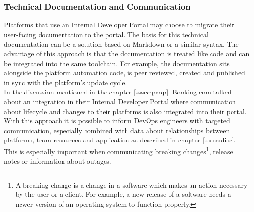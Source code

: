 \documentclass[a4paper,12pt]{article}
\begin{document}
    \subsubsection{Technical Documentation and Communication}
    \label{sssec:techdoc}
    Platforms that use an Internal Developer Portal may choose to migrate their user-facing documentation to the portal.
    The basis for this technical documentation can be a solution based on Markdown\parencite{backstagetechdocs}
    or a similar syntax.
    The advantage of this approach is that the documentation is treated like code and can be integrated into the same toolchain.
    For example, the documentation sits alongside the platform automation code, is peer reviewed, created
    and published in sync with the platform's update cycle.\\
    In the discussion mentioned in the chapter \ref{sssec:paap}, Booking.com talked about an integration in their Internal
    Developer Portal where communication about lifecycle and changes to their platforms is also integrated into their portal.
    With this approach it is possible to inform DevOps engineers with targeted communication, especially combined with data about relationships
    between platforms, team resources and application as described in chapter \ref{sssec:disc}.
    This is especially important when communicating breaking changes\footnote{A breaking change is a change in a software
    which makes an action necessary by the user or a client. For example, a new release of a software needs a newer version
    of an operating system to function properly.}, release notes or information about outages.
\end{document}
